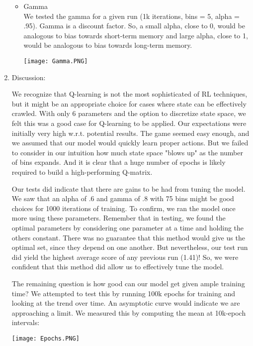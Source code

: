 \documentclass[12pt]{article}
\newcommand\tab[1][0.5cm]{\hspace*{#1}}
\begin{document}
\begin{enumerate}
\begin{itemize}
	\item Gamma \\
		\tab We tested the gamma for a given run (1k iterations, bins = 5, alpha = .95).  Gamma is a discount factor.  So, a small alpha, close to 0, would be analogous to bias towards short-term memory and large alpha, close to 1, would be analogous to bias towards long-term memory.
		\begin{center} \texttt{[image: Gamma.PNG]} \end{center}
\end{itemize}

\item
Discussion:

\tab We recognize that Q-learning is not the most sophisticated of RL techniques, but it might be an appropriate choice for cases where state can be effectively crawled.  With only 6 parameters and the option to discretize state space, we felt this was a good case for Q-learning to be applied.  Our expectations were initially very high w.r.t. potential results.  The game seemed easy enough, and we assumed that our model would quickly learn proper actions.  But we failed to consider in our intuition how much state space "blows up" as the number of bins expands.  And it is clear that a huge number of epochs is likely required to build a high-performing Q-matrix.

\tab Our tests did indicate that there are gains to be had from tuning the model.  We saw that an alpha of .6 and gamma of .8 with 75 bins might be good choices for 1000 iterations of training.  To confirm, we ran the model once more using these parameters.  Remember that in testing, we found the optimal parameters by considering one parameter at a time and holding the others constant.  There was no guarantee that this method would give us the optimal set, since they depend on one another.  But nevertheless, our test run did yield the highest average score of any previous run (1.41)!  So, we were confident that this method did allow us to effectively tune the model.

\tab The remaining question is how good can our model get given ample training time?  We attempted to test this by running 100k epochs for training and looking at the trend over time.  An asymptotic curve would indicate we are approaching a limit. We measured this by computing the mean at 10k-epoch intervals:

\begin{center}\texttt{[image: Epochs.PNG]}\end{center}


\end{enumerate}
\end{document}
